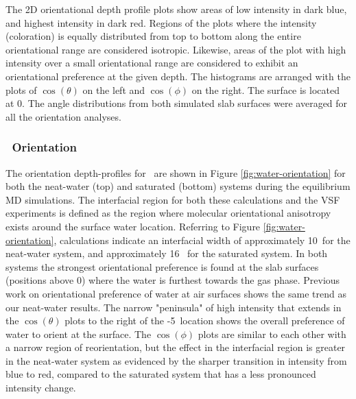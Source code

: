 \documentclass{article}
\begin{document}
The 2D orientational depth profile plots show areas of low intensity in dark blue, and highest intensity in dark red. Regions of the plots where the intensity (coloration) is equally distributed from top to bottom along the entire orientational range are considered isotropic. Likewise, areas of the plot with high intensity over a small orientational range are considered to exhibit an orientational preference at the given depth.  The histograms are arranged with the plots of $\cos(\theta)$ on the left and $\cos(\phi)$ on the right. The surface is located at 0\angs. The angle distributions from both simulated slab surfaces were averaged for all the orientation analyses.

\subsubsection{\wat~Orientation}

The orientation depth-profiles for \wat~are shown in Figure \ref{fig:water-orientation} for both the neat-water (top) and saturated (bottom) systems during the equilibrium MD simulations. The interfacial region for both these calculations and the VSF experiments is defined as the region where molecular orientational anisotropy exists around the surface water location. Referring to Figure \ref{fig:water-orientation}, calculations indicate an interfacial width of approximately 10\angs~for the neat-water system, and approximately 16 \angs~for the saturated system. In both systems the strongest orientational preference is found at the slab surfaces (positions above 0\angs) where the water is furthest towards the gas phase. Previous work on orientational preference of water at air surfaces shows the same trend as our neat-water results.\cite{Walker2006b,Hore2008} The narrow "peninsula" of high intensity that extends in the $\cos(\theta)$ plots to the right of the -5\angs~location shows the overall preference of water to orient at the surface. The $\cos(\phi)$ plots are similar to each other with a narrow region of reorientation, but the effect in the interfacial region is greater in the neat-water system as evidenced by the sharper transition in intensity from blue to red, compared to the saturated system that has a less pronounced intensity change.
\end{document}
